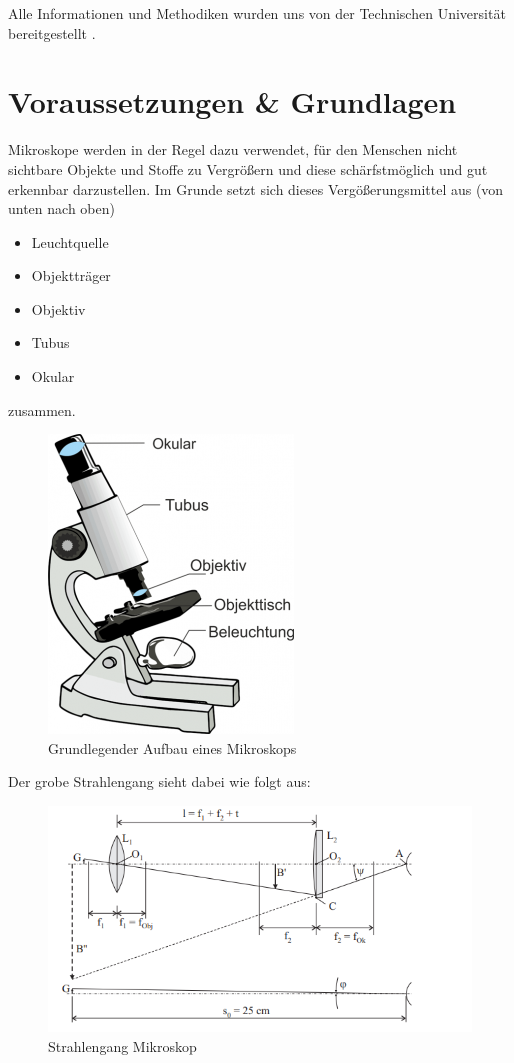 \documentclass[12pt,a4paper,twoside]{article}
\begin{document}
\noindent
Alle Informationen und Methodiken wurden uns von der Technischen Universität bereitgestellt \cite{teachcenter1}. 


\section{Voraussetzungen \& Grundlagen} %

Mikroskope werden in der Regel dazu verwendet, für den Menschen nicht sichtbare Objekte und Stoffe zu Vergrößern und diese schärfstmöglich und gut erkennbar darzustellen.
Im Grunde setzt sich dieses Vergößerungsmittel aus (von unten nach oben) 

\begin{itemize}
    \item Leuchtquelle
    \item Objektträger
    \item Objektiv
    \item Tubus
    \item Okular
\end{itemize}

\noindent
zusammen.

\begin{figure}[H]
    \centering
    \includegraphics[width=0.3\linewidth]{nudes/mikroskop_aufbau.png}
    \caption{Grundlegender Aufbau eines Mikroskops \cite{mikr_aufbau}}
    \label{fig:Aufbau Mikroskop}
\end{figure}

\noindent
Der grobe Strahlengang sieht dabei wie folgt aus:

\begin{figure}[H]
    \centering
    \includegraphics[width=0.7\linewidth]{nudes/StrahlengangMikro.png}
    \caption{Strahlengang Mikroskop \cite{teachcenter1}}
    \label{fig:Strahlengang Mikroskop}
\end{figure}
\end{document}
